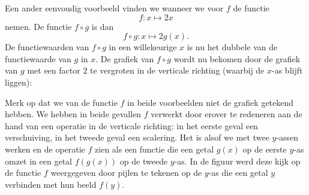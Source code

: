Een ander eenvoudig voorbeeld vinden we wanneer we voor $f$ de functie
\[
f:x\mapsto 2x
\]
nemen.
De functie $f\circ g$ is dan
\[
f\circ g: x\mapsto 2 g(x).
\]
De functiewaarden van $f\circ g$ in een willekeurige $x$ is nu het
dubbele van de functiewaarde van $g$ in $x$. De grafiek van $f\circ g$
wordt nu bekomen door de grafiek van $g$ met een factor $2$ te
vergroten in de verticale richting (waarbij de $x$-as blijft liggen):

\begin{center}
\end{center}


Merk op dat we van de functie $f$ in beide voorbeelden niet de grafiek
getekend hebben. We hebben in beide gevallen $f$ verwerkt door erover
te redeneren aan de hand van een operatie in de verticale richting: in
het eerste geval een verschuiving, in het tweede geval een
scalering. Het is alsof we met twee $y$-assen werken en de operatie $f$
zien als een functie die een getal $g(x)$ op de eerste $y$-as omzet in
een getal $f(g(x))$ op de tweede $y$-as. In de figuur werd deze
kijk op de functie $f$ weergegeven door pijlen te tekenen op de $y$-as
die een getal $y$ verbinden met hun beeld $f(y)$.

